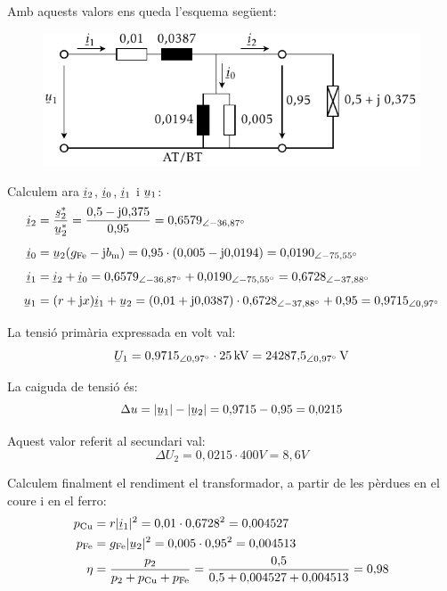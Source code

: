\begin{exemple}
    Amb aquests valors ens queda l'esquema seg\"{u}ent:

    \begin{figure}[htb]
    \centering
        \includegraphics{Imatges/Cap-TrafosPot-Exemple-TR.pdf}
    \end{figure}

    Calculem ara $\cmplx{i}_2$, $\cmplx{i}_0$, $\cmplx{i}_1$ i $\cmplx{u}_1$:
    \begin{align*}
    \cmplx{i}_2 &= \frac{\cmplx{s}_2^*}{\cmplx{u}_2^*} = \frac{0{,}5 - \ju 0{,}375}{0{,}95} = 0{,}6579_{\angle -36{,}87\degree} \\[1ex]
    \cmplx{i}_0 &= \cmplx{u}_2 (g\ped{Fe}-\ju b\ped{m}) = 0{,}95\cdot(0{,}005-\ju 0{,}0194) = 0{,}0190_{\angle -75{,}55\degree} \\[1ex]
    \cmplx{i}_1 &= \cmplx{i}_2 + \cmplx{i}_0 =0{,}6579_{\angle -36{,}87\degree} +0{,}0190_{\angle -75{,}55\degree} = 0{,}6728_{\angle -37{,}88\degree} \\[1ex]
    \cmplx{u}_1 &=(r+\ju x) \cmplx{i}_1 + \cmplx{u}_2 = (0{,}01+\ju 0{,}0387) \cdot 0{,}6728_{\angle -37{,}88\degree} + 0{,}95 = 0{,}9715_{\angle 0{,}97\degree}
  \end{align*}

  La tensi\'{o} prim\`{a}ria expressada en volt val:
  \[
    \cmplx{U}_1 = 0{,}9715_{\angle 0{,}97\degree}\cdot 25\unit{kV} = 24287{,}5_{\angle 0{,}97\degree}\unit{V}
  \]

   La caiguda de tensi\'{o} \'{e}s:
   \[
        \Delta u = |\cmplx{u}_1| - |\cmplx{u}_2| = 0{,}9715 - 0{,}95 = 0{,}0215
   \]

   Aquest valor referit al secundari val:
   \[
        \Delta U_2 = 0{,}0215\cdot 400\unit{V} = 8{,}6\unit{V}
   \]

   Calculem finalment el rendiment el transformador, a partir de les p\`{e}rdues en el coure  i en el ferro:
   \begin{align*}
    p\ped{Cu} &= r |\cmplx{i}_1|^2  = 0{,}01\cdot 0{,}6728^2 = 0{,}004527\\
    p\ped{Fe} &= g\ped{Fe} |\cmplx{u}_2|^2 = 0{,}005\cdot 0{,}95^2 = 0{,}004513\\
    \eta &= \frac{p_2}{p_2 + p\ped{Cu} + p\ped{Fe}} = \frac{0{,}5}{0{,}5 + 0{,}004527 + 0{,}004513 } = 0{,}98
  \end{align*}

\end{exemple}

